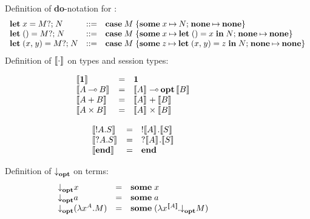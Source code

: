 \begin{figure*}
  \begin{mdframed}\begin{highlight}
    Definition of \textbf{do}-notation for \affineAGV:%
    \[
      \begin{array}{lcl}
        \gvDo{x}{M}{N} &::=& \gvDoDef{x}{M}{N}
        \\
        \gvDo{\gvUnit}{M}{N} &::=& \gvDoDef{x}{M}{\gvLetUnit{x}{N}}
        \\
        \gvDo{\gvPair{x}{y}}{M}{N} &::=& \gvDoDef{z}{M}{\gvLetPair{x}{y}{z}{N}}
      \end{array}
    \] 
    Definition of $\ftm{\cdot}$ on types and session types:%
    \begin{center}
      \begin{minipage}[t]{0.5\linewidth}
        \[
          \begin{array}{lcl}
            \ftm{\gvTyUnit}         & = & \gvTyUnit
            \\
            \ftm{{\gvTyFun{A}{B}}}  & = & \gvTyFun{\ftm{A}}{\gvTyOpt{\ftm{B}}}
            \\
            \ftm{{\gvTySum{A}{B}}}  & = & \gvTySum{\ftm{A}}{\ftm{B}}
            \\
            \ftm{{\gvTyPair{A}{B}}} & = & \gvTyPair{\ftm{A}}{\ftm{B}}
          \end{array}
        \]
      \end{minipage}%
      \begin{minipage}[t]{0.5\linewidth}
        \[
          \begin{array}{lcl}
            \ftm{{\gvTySend{A}{S}}} & = & \gvTySend{\ftm{A}}{\ftm{S}}
            \\
            \ftm{{\gvTyRecv{A}{S}}} & = & \gvTyRecv{\ftm{A}}{\ftm{S}}
            \\
            \ftm{\gvTyEnd}          & = & \gvTyEnd
          \end{array}
        \]
      \end{minipage}
    \end{center}
    Definition of $\atm{}$ on terms:%
    \[
      \begin{array}{lcl}
        \atm{\tm{x}}
        & = & \gvSome{\tm{x}}
        \\
        \atm{\tm{a}}
        & = & \gvSome{\tm{a}}
        \\
        \atm{\parens{\gvAbs[A]{x}{M}}}
        & = & \gvSome{\parens{\gvAbs[\ftm{A}]{x}{\atm{M}}}}
        \\

\end{array}\]
\end{highlight}
\end{mdframed}
\end{figure*}
